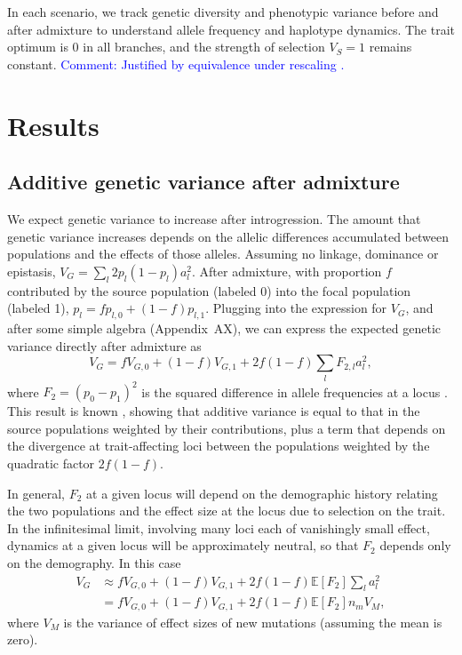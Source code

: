 \documentclass{article}
\newcommand{\aprcomment}[1]{{\textcolor{blue}{Comment: #1}}}
\begin{document}
In each scenario, we track genetic diversity and phenotypic variance before and
after admixture to understand allele frequency and haplotype dynamics. The
trait optimum is $0$ in all branches, and the strength of selection $V_S=1$
remains constant. \aprcomment{Justified by equivalence under rescaling
\citep{simons2018population}.}

\section*{Results}

\subsection*{Additive genetic variance after admixture}

We expect genetic variance to increase after introgression. The amount that
genetic variance increases depends on the allelic differences accumulated
between populations and the effects of those alleles. Assuming no linkage,
dominance or epistasis, \(V_G=\sum_l 2p_l(1-p_l)a_l^2\). After admixture, with
proportion $f$ contributed by the source population (labeled 0) into the focal
population (labeled 1), \(p_l = fp_{l,0} + (1-f)p_{l,1}\). Plugging into the
expression for $V_G$, and after some simple algebra (Appendix~AX), we can
express the expected genetic variance directly after admixture as \[V_G =
fV_{G,0} + (1-f) V_{G,1} + 2f(1-f)\sum_l F_{2,l} a_l^2,\] where $F_2 = (p_0 -
p_1)^2$ is the squared difference in allele frequencies at a locus
\citep[e.g.,][]{peter2016admixture}. This result is known
\citep[e.g.,][]{tufto2000quantitative}, showing that additive variance is equal
to that in the source populations weighted by their contributions, plus a term
that depends on the divergence at trait-affecting loci between the populations
weighted by the quadratic factor $2f(1-f)$.

In general, $F_2$ at a given locus will depend on the demographic history
relating the two populations and the effect size at the locus due to selection
on the trait. In the infinitesimal limit, involving many loci each of
vanishingly small effect, dynamics at a given locus will be approximately
neutral, so that $F_2$ depends only on the demography. In this case
\begin{align*}
    V_G & \approx f V_{G,0} + (1-f) V_{G,1} + 2f(1-f)\mathbb{E}[F_2] \sum_l a_l^2 \\
    & = f V_{G,0} + (1-f) V_{G,1} + 2f(1-f)\mathbb{E}[F_2] n_m V_M,
\end{align*}
where $V_M$ is the variance of effect sizes of new mutations (assuming the mean
is zero). 
\end{document}
